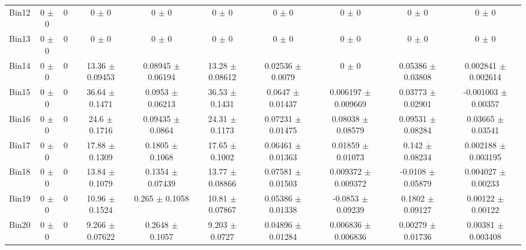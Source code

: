 \begin{tabular}{@{\extracolsep{4pt}}lccccccccc@{}}
     Bin12 & 0 $\pm$ 0 & 0 & 0 $\pm$ 0 & 0 $\pm$ 0 & 0 $\pm$ 0 & 0 $\pm$ 0 & 0 $\pm$ 0 & 0 $\pm$ 0 & 0 $\pm$ 0 \\ 
     Bin13 & 0 $\pm$ 0 & 0 & 0 $\pm$ 0 & 0 $\pm$ 0 & 0 $\pm$ 0 & 0 $\pm$ 0 & 0 $\pm$ 0 & 0 $\pm$ 0 & 0 $\pm$ 0 \\ 
     Bin14 & 0 $\pm$ 0 & 0 & 13.36 $\pm$ 0.09453 & 0.08945 $\pm$ 0.06194 & 13.28 $\pm$ 0.08612 & 0.02536 $\pm$ 0.0079 & 0 $\pm$ 0 & 0.05386 $\pm$ 0.03808 & 0.002841 $\pm$ 0.002614 \\ 
     Bin15 & 0 $\pm$ 0 & 0 & 36.64 $\pm$ 0.1471 & 0.0953 $\pm$ 0.06213 & 36.53 $\pm$ 0.1431 & 0.0647 $\pm$ 0.01437 & 0.006197 $\pm$ 0.009669 & 0.03773 $\pm$ 0.02901 & -0.001003 $\pm$ 0.00357 \\ 
     Bin16 & 0 $\pm$ 0 & 0 & 24.6 $\pm$ 0.1716 & 0.09435 $\pm$ 0.0864 & 24.31 $\pm$ 0.1173 & 0.07231 $\pm$ 0.01475 & 0.08038 $\pm$ 0.08579 & 0.09531 $\pm$ 0.08284 & 0.03665 $\pm$ 0.03541 \\ 
     Bin17 & 0 $\pm$ 0 & 0 & 17.88 $\pm$ 0.1309 & 0.1805 $\pm$ 0.1068 & 17.65 $\pm$ 0.1002 & 0.06461 $\pm$ 0.01363 & 0.01859 $\pm$ 0.01073 & 0.142 $\pm$ 0.08234 & 0.002188 $\pm$ 0.003195 \\ 
     Bin18 & 0 $\pm$ 0 & 0 & 13.84 $\pm$ 0.1079 & 0.1354 $\pm$ 0.07439 & 13.77 $\pm$ 0.08866 & 0.07581 $\pm$ 0.01503 & 0.009372 $\pm$ 0.009372 & -0.0108 $\pm$ 0.05879 & 0.004027 $\pm$ 0.00233 \\ 
     Bin19 & 0 $\pm$ 0 & 0 & 10.96 $\pm$ 0.1524 & 0.265 $\pm$ 0.1058 & 10.81 $\pm$ 0.07867 & 0.05386 $\pm$ 0.01338 & -0.0853 $\pm$ 0.09239 & 0.1802 $\pm$ 0.09127 & 0.00122 $\pm$ 0.00122 \\ 
     Bin20 & 0 $\pm$ 0 & 0 & 9.266 $\pm$ 0.07622 & 0.2648 $\pm$ 0.1057 & 9.203 $\pm$ 0.0727 & 0.04896 $\pm$ 0.01284 & 0.006836 $\pm$ 0.006836 & 0.00279 $\pm$ 0.01736 & 0.00381 $\pm$ 0.003408 \\ 
\hline\hline
  \end{tabular}
